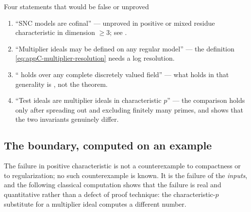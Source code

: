 \begin{warning}{Four statements that would be false or unproved}
\begin{enumerate}
\item ``SNC models are cofinal'' --- unproved in positive or mixed residue
characteristic in dimension $\geq3$; see .
\item ``Multiplier ideals may be defined on any regular model'' --- the
definition \eqref{eq:appC-multiplier-resolution} needs a log resolution.
\item `` holds over any complete
discretely valued field'' --- what holds in that generality is
, not the theorem.
\item ``Test ideals are multiplier ideals in characteristic $p$'' --- the
comparison  holds only after spreading out and
excluding finitely many primes, and
 shows that the two invariants genuinely differ.
\end{enumerate}
\end{warning}

\subsection{The boundary, computed on an example}

The failure in positive characteristic is not a counterexample to
compactness or to regularization; no such counterexample is known.  It is
the failure of the \emph{inputs}, and the following classical computation
shows that the failure is real and quantitative rather than a defect of
proof technique: the characteristic-$p$ substitute for a multiplier ideal
computes a different number.

